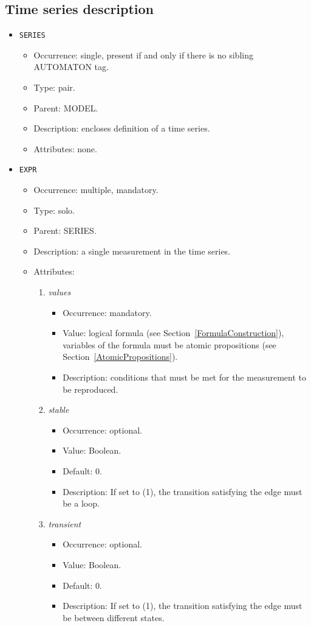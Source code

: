 \documentclass[12pt]{article}
\newenvironment{menum}{
\begin{enumerate}
  \setlength{\itemsep}{0pt}
  \setlength{\parskip}{0pt}
  \setlength{\parsep}{0pt}
}{\end{enumerate}}
\newenvironment{mitem}{
\begin{itemize}
  \setlength{\itemsep}{0pt}
  \setlength{\parskip}{0pt}
  \setlength{\parsep}{0pt}
}{\end{itemize}}
\begin{document}
\subsection{Time series description}
\begin{mitem}
	\item \texttt{SERIES}
	\begin{mitem}
		\item Occurrence: single,  present if and only if there is no sibling AUTOMATON tag.
		\item Type: pair.
		\item Parent: MODEL.
		\item Description: encloses definition of a time series.
		\item Attributes: none.
	\end{mitem}
\end{mitem}				
	
\begin{mitem}
	\item \texttt{EXPR}
	\begin{mitem}
		\item Occurrence: multiple, mandatory.
		\item Type: solo.
		\item Parent: SERIES.
		\item Description: a single measurement in the time series.
		\item Attributes:	
		\begin{menum}
			\item \textit{values} 
			\begin{mitem}
				\item Occurrence: mandatory.
				\item Value: logical formula (see Section~\ref{FormulaConstruction}), variables of the formula must be atomic propositions (see Section~\ref{AtomicPropositions}).
				\item Description: conditions that must be met for the measurement to be reproduced.
			\end{mitem}
						\item \textit{stable} 
			\begin{mitem}
				\item Occurrence: optional.
				\item Value: Boolean.
				\item Default: 0.
				\item Description: If set to (1), the transition satisfying the edge must be a loop.
			\end{mitem}
			\item \textit{transient} 
			\begin{mitem}
				\item Occurrence: optional.
				\item Value: Boolean.
				\item Default: 0.
				\item Description: If set to (1), the transition satisfying the edge must be between different states.
			\end{mitem}
		\end{menum}
	\end{mitem}
\end{mitem}	
\end{document}
